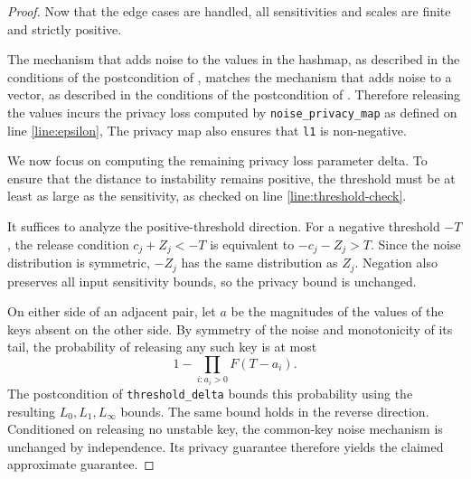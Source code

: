 \documentclass{article}
\begin{document}
\begin{proof}
    Now that the edge cases are handled, all sensitivities and scales are finite and strictly positive.

    The mechanism that adds noise to the values in the hashmap, as described in the conditions of the postcondition of ,
    matches the mechanism that adds noise to a vector, as described in the conditions of the postcondition of .
    Therefore releasing the values incurs the privacy loss computed by \texttt{noise\_privacy\_map} as defined on line \ref{line:epsilon},
    The privacy map also ensures that \texttt{l1} is non-negative.

    We now focus on computing the remaining privacy loss parameter delta.
    To ensure that the distance to instability remains positive,
    the threshold must be at least as large as the sensitivity, as checked on line \ref{line:threshold-check}.

    It suffices to analyze the positive-threshold direction.
    For a negative threshold $-T$, the release condition $c_j + Z_j < -T$
    is equivalent to $-c_j - Z_j > T$.
    Since the noise distribution is symmetric, $-Z_j$ has the same distribution as $Z_j$.
    Negation also preserves all input sensitivity bounds, so the privacy bound is unchanged.

    On either side of an adjacent pair, let $a$ be the magnitudes of the values of the keys absent on the other side.
    By symmetry of the noise and monotonicity of its tail, the probability of releasing any such key is at most
    \[
       1-\prod_{i:a_i>0}F(T-a_i).
    \]
    The postcondition of \texttt{threshold\_delta} bounds this probability using the resulting $L_0,L_1,L_\infty$ bounds.
    The same bound holds in the reverse direction.
    Conditioned on releasing no unstable key, the common-key noise mechanism is unchanged by independence.
    Its privacy guarantee therefore yields the claimed approximate guarantee.
\end{proof}



\end{document}
